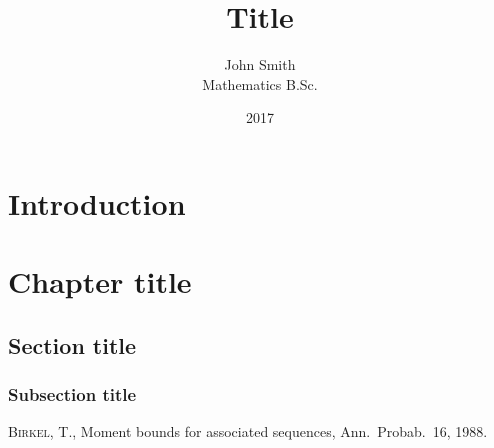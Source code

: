\documentclass[colorlinks]{thesis-ekf}
\theoremstyle{definition}
\theoremstyle{remark}
\begin{document}
\title{Title}
\author{John Smith\\ Mathematics B.Sc.}
\date{2017}
\maketitle
\tableofcontents

\chapter*{Introduction}
\chapter{Chapter title}
\section{Section title}
\subsection{Subsection title}

\begin{thebibliography}{1}
 \textsc{Birkel, T.}, Moment bounds for associated sequences, Ann.\ Probab.\ 16, 1988.
\end{thebibliography}
\end{document}

